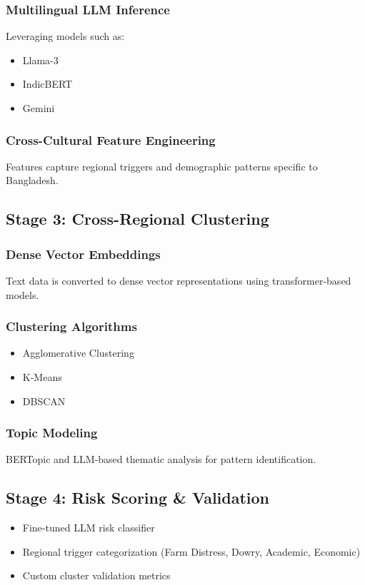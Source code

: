 \documentclass[12pt,a4paper]{article}
\begin{document}
\subsubsection{Multilingual LLM Inference}
Leveraging models such as:
\begin{itemize}
    \item Llama-3
    \item IndicBERT
    \item Gemini
\end{itemize}

\subsubsection{Cross-Cultural Feature Engineering}
Features capture regional triggers and demographic patterns specific to Bangladesh.

\subsection{Stage 3: Cross-Regional Clustering}
\subsubsection{Dense Vector Embeddings}
Text data is converted to dense vector representations using transformer-based models.

\subsubsection{Clustering Algorithms}
\begin{itemize}
    \item Agglomerative Clustering
    \item K-Means
    \item DBSCAN
\end{itemize}

\subsubsection{Topic Modeling}
BERTopic and LLM-based thematic analysis for pattern identification.

\subsection{Stage 4: Risk Scoring \& Validation}
\begin{itemize}
    \item Fine-tuned LLM risk classifier
    \item Regional trigger categorization (Farm Distress, Dowry, Academic, Economic)
    \item Custom cluster validation metrics
\end{itemize}
\end{document}
